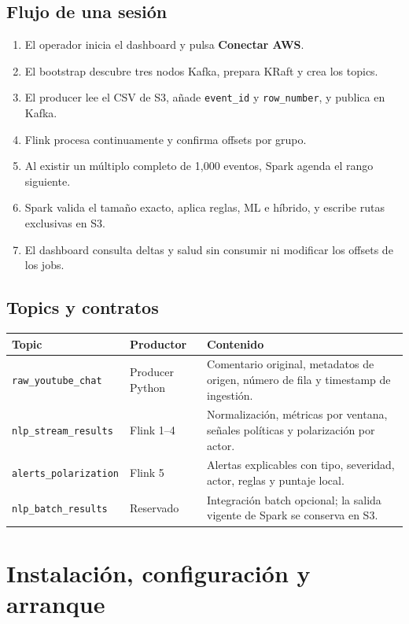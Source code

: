\documentclass[11pt,a4paper,openany]{report}
\newcommand{\topic}[1]{\texttt{#1}}
\begin{document}
\section{Flujo de una sesión}

\begin{enumerate}
  \item El operador inicia el dashboard y pulsa \textbf{Conectar AWS}.
  \item El bootstrap descubre tres nodos Kafka, prepara KRaft y crea los topics.
  \item El producer lee el CSV de S3, añade \topic{event\_id} y \topic{row\_number}, y publica en Kafka.
  \item Flink procesa continuamente y confirma offsets por grupo.
  \item Al existir un múltiplo completo de 1,000 eventos, Spark agenda el rango siguiente.
  \item Spark valida el tamaño exacto, aplica reglas, ML e híbrido, y escribe rutas exclusivas en S3.
  \item El dashboard consulta deltas y salud sin consumir ni modificar los offsets de los jobs.
\end{enumerate}

\section{Topics y contratos}

\begin{tabularx}{\textwidth}{p{3.7cm}p{3.1cm}Y}
\toprule
\textbf{Topic} & \textbf{Productor} & \textbf{Contenido}\\
\midrule
\topic{raw\_youtube\_chat} & Producer Python & Comentario original, metadatos de origen, número de fila y timestamp de ingestión.\\
\topic{nlp\_stream\_results} & Flink 1--4 & Normalización, métricas por ventana, señales políticas y polarización por actor.\\
\topic{alerts\_polarization} & Flink 5 & Alertas explicables con tipo, severidad, actor, reglas y puntaje local.\\
\topic{nlp\_batch\_results} & Reservado & Integración batch opcional; la salida vigente de Spark se conserva en S3.\\
\bottomrule
\end{tabularx}

\chapter{Instalación, configuración y arranque}
\end{document}
